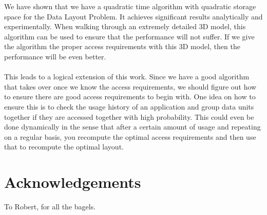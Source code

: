 \documentclass[conference]{acmsiggraph}
\begin{document}
We have shown that we have a quadratic time algorithm with quadratic storage space for the Data Layout Problem. It achieves significant results analytically and experimentally. When walking through an extremely detailed 3D model, this algorithm can be used to ensure that the performance will not suffer. If we give the algorithm the proper access requirements with this 3D model, then the performance will be even better.\\
\\
This leads to a logical extension of this work. Since we have a good algorithm that takes over once we know the access requirements, we should figure out how to ensure there are good access requirements to begin with. One idea on how to ensure this is to check the usage history of an application and group data units together if they are accessed together with high probability. This could even be done dynamically in the sense that after a certain amount of usage and repeating on a regular basis, you recompute the optimal access requirements and then use that to recompute the optimal layout. 

\section{Acknowledgements}

To Robert, for all the bagels.



\end{document}
